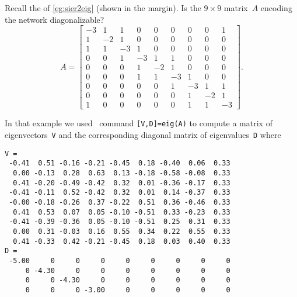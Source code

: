 \begin{example} \label{eg:sier2eigp}
Recall the  of \autoref{eg:sier2eig} (shown in the margin).
Is the \(9\times9\) matrix~\(A\) encoding the network diagonalizable?
%
\begin{equation*}
A=\begin{bmatrix}-3&1&1&0&0&0&0&0&1
\\1&-2&1&0&0&0&0&0&0
\\1&1&-3&1&0&0&0&0&0
\\0&0&1&-3&1&1&0&0&0
\\0&0&0&1&-2&1&0&0&0
\\0&0&0&1&1&-3&1&0&0
\\0&0&0&0&0&1&-3&1&1
\\0&0&0&0&0&0&1&-2&1
\\1&0&0&0&0&0&1&1&-3 \end{bmatrix}.
\end{equation*}
\begin{solution} 
In that example we used \script\ command \verb|[V,D]=eig(A)| to compute a matrix of eigenvectors~\verb|V| and the corresponding diagonal matrix of eigenvalues~\verb|D| where \twodp
{\small%
\begin{verbatim}
V =
 -0.41  0.51 -0.16 -0.21 -0.45  0.18 -0.40  0.06  0.33
  0.00 -0.13  0.28  0.63  0.13 -0.18 -0.58 -0.08  0.33
  0.41 -0.20 -0.49 -0.42  0.32  0.01 -0.36 -0.17  0.33
 -0.41 -0.11  0.52 -0.42  0.32  0.01  0.14 -0.37  0.33
 -0.00 -0.18 -0.26  0.37 -0.22  0.51  0.36 -0.46  0.33
  0.41  0.53  0.07  0.05 -0.10 -0.51  0.33 -0.23  0.33
 -0.41 -0.39 -0.36  0.05 -0.10 -0.51  0.25  0.31  0.33
  0.00  0.31 -0.03  0.16  0.55  0.34  0.22  0.55  0.33
  0.41 -0.33  0.42 -0.21 -0.45  0.18  0.03  0.40  0.33
D =
 -5.00     0     0     0     0     0     0     0     0
     0 -4.30     0     0     0     0     0     0     0
     0     0 -4.30     0     0     0     0     0     0
     0     0     0 -3.00     0     0     0     0     0

\end{verbatim}}
\end{solution}
\end{example}
